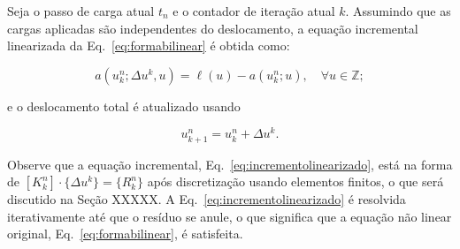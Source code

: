 Seja o passo de carga atual $t_n$ e o contador de iteração atual $k$. Assumindo que as cargas aplicadas são independentes do deslocamento, a equação incremental linearizada da Eq.~\eqref{eq:formabilinear} é obtida como:

\begin{equation}\label{eq:incrementolinearizado}
	a \left( u^n_k; \Delta u^k, u \right) = \ell \left( u \right) - a \left( u^n_k; u \right), \quad \forall u \in \mathbb{Z}; 
\end{equation}

e o deslocamento total é atualizado usando

\begin{equation}
	u^{n}_{k+1} = u^{n}_{k} + \Delta u^k. \tag{3.76}
\end{equation}

Observe que a equação incremental, Eq.~\eqref{eq:incrementolinearizado}, está na forma de $[K^n_k] \cdot \{ \Delta u^k \} = \{ R^n_k \}$ após discretização usando elementos finitos, o que será discutido na {\color{red}Seção XXXXX}. A Eq.~\eqref{eq:incrementolinearizado} é resolvida iterativamente até que o resíduo se anule, o que significa que a equação não linear original, Eq.~\eqref{eq:formabilinear}, é satisfeita.
